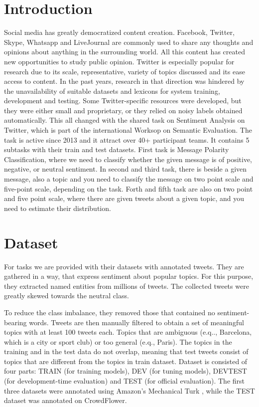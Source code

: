 \documentclass[runningheads,a4paper]{llncs}
\begin{document}
\section{Introduction}
Social media has greatly democratized content creation. Facebook, Twitter, Skype, Whatsapp and LiveJournal are commonly used to share any thoughts and opinions about anything in the surrounding world. All this content has created new opportunities to study public opinion. Twitter is especially popular for research due to its scale, representative, variety of topics discussed and its ease access to content. In the past years, research in that direction was hindered by the unavailability of suitable datasets and lexicons for system training, development and testing. Some Twitter-specific resources were developed, but they were either small and proprietary, or they relied on noisy labels obtained automatically. This all changed with the shared task on Sentiment Analysis on Twitter, which is part of the international Worksop on Semantic Evaluation. The task is active since 2013 and it attract over 40+ participant teams. It contains 5 subtasks with their train and test datasets. First task is Message Polarity Classification, where we need to classify whether the given message is of positive, negative, or neutral sentiment. In second and third task, there is beside a given message, also a topic and you need to classify the message on two point scale and five-point scale, depending on the task. Forth and fifth task are also on two point and five point scale, where there are given tweets about a given topic, and you need to estimate their distribution.

\section{Dataset}
 For tasks we are provided with their datasets with annotated tweets. They are gathered in a way, that express sentiment about popular topics. For this purpose, they extracted named entities from millions of tweets. The collected tweets were greatly skewed towards the neutral class. 
 
 To reduce the class imbalance, they removed those that contained no sentiment-bearing words. Tweets are then manually filtered to obtain a set of meaningful topics with at least 100 tweets each. Topics that are ambiguous (e.q.., Barcelona, which is a city or sport club) or too general (e.q., Paris). The topics in the training and in the test data do not overlap, meaning that test tweets consist of topics that are different from the topics in train dataset. Dataset is consisted of four parts: TRAIN (for training models), DEV (for tuning models), DEVTEST (for development-time evaluation) and TEST (for official evaluation). The first three datasets were annotated using Amazon's Mechanical Turk , while the TEST dataset was annotated on CrowdFlower.
 
\end{document}
